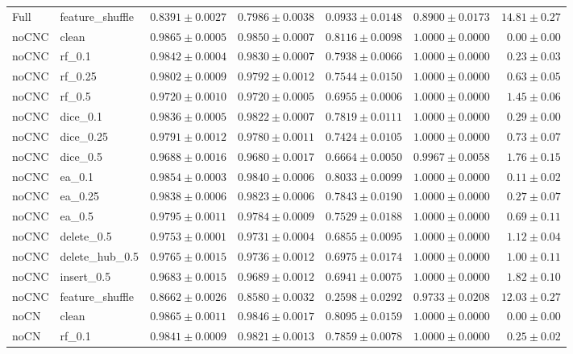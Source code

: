 \documentclass[UTF8,a4paper,11pt,fontset=fandol]{ctexart}
\begin{document}
{\begin{longtable}{llrrrrr}
Full & feature\_shuffle & $0.8391\pm0.0027$ & $0.7986\pm0.0038$ & $0.0933\pm0.0148$ & $0.8900\pm0.0173$ & $14.81\pm0.27$ \\
noCNC & clean & $0.9865\pm0.0005$ & $0.9850\pm0.0007$ & $0.8116\pm0.0098$ & $1.0000\pm0.0000$ & $0.00\pm0.00$ \\
noCNC & rf\_0.1 & $0.9842\pm0.0004$ & $0.9830\pm0.0007$ & $0.7938\pm0.0066$ & $1.0000\pm0.0000$ & $0.23\pm0.03$ \\
noCNC & rf\_0.25 & $0.9802\pm0.0009$ & $0.9792\pm0.0012$ & $0.7544\pm0.0150$ & $1.0000\pm0.0000$ & $0.63\pm0.05$ \\
noCNC & rf\_0.5 & $0.9720\pm0.0010$ & $0.9720\pm0.0005$ & $0.6955\pm0.0006$ & $1.0000\pm0.0000$ & $1.45\pm0.06$ \\
noCNC & dice\_0.1 & $0.9836\pm0.0005$ & $0.9822\pm0.0007$ & $0.7819\pm0.0111$ & $1.0000\pm0.0000$ & $0.29\pm0.00$ \\
noCNC & dice\_0.25 & $0.9791\pm0.0012$ & $0.9780\pm0.0011$ & $0.7424\pm0.0105$ & $1.0000\pm0.0000$ & $0.73\pm0.07$ \\
noCNC & dice\_0.5 & $0.9688\pm0.0016$ & $0.9680\pm0.0017$ & $0.6664\pm0.0050$ & $0.9967\pm0.0058$ & $1.76\pm0.15$ \\
noCNC & ea\_0.1 & $0.9854\pm0.0003$ & $0.9840\pm0.0006$ & $0.8033\pm0.0099$ & $1.0000\pm0.0000$ & $0.11\pm0.02$ \\
noCNC & ea\_0.25 & $0.9838\pm0.0006$ & $0.9823\pm0.0006$ & $0.7843\pm0.0190$ & $1.0000\pm0.0000$ & $0.27\pm0.07$ \\
noCNC & ea\_0.5 & $0.9795\pm0.0011$ & $0.9784\pm0.0009$ & $0.7529\pm0.0188$ & $1.0000\pm0.0000$ & $0.69\pm0.11$ \\
noCNC & delete\_0.5 & $0.9753\pm0.0001$ & $0.9731\pm0.0004$ & $0.6855\pm0.0095$ & $1.0000\pm0.0000$ & $1.12\pm0.04$ \\
noCNC & delete\_hub\_0.5 & $0.9765\pm0.0015$ & $0.9736\pm0.0012$ & $0.6975\pm0.0174$ & $1.0000\pm0.0000$ & $1.00\pm0.11$ \\
noCNC & insert\_0.5 & $0.9683\pm0.0015$ & $0.9689\pm0.0012$ & $0.6941\pm0.0075$ & $1.0000\pm0.0000$ & $1.82\pm0.10$ \\
noCNC & feature\_shuffle & $0.8662\pm0.0026$ & $0.8580\pm0.0032$ & $0.2598\pm0.0292$ & $0.9733\pm0.0208$ & $12.03\pm0.27$ \\
noCN & clean & $0.9865\pm0.0011$ & $0.9846\pm0.0017$ & $0.8095\pm0.0159$ & $1.0000\pm0.0000$ & $0.00\pm0.00$ \\
noCN & rf\_0.1 & $0.9841\pm0.0009$ & $0.9821\pm0.0013$ & $0.7859\pm0.0078$ & $1.0000\pm0.0000$ & $0.25\pm0.02$ \\

\end{longtable}}
\end{document}
